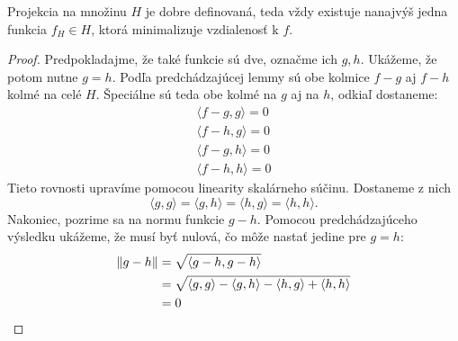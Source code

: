 \begin{lemma}
  Projekcia na množinu $H$ je dobre definovaná, teda vždy existuje
  nanajvýš jedna funkcia $f_H \in H$, ktorá minimalizuje vzdialenosť
  k $f$.
\end{lemma}
\begin{proof}
  Predpokladajme, že také funkcie sú dve, označme ich $g, h$. Ukážeme,
  že potom nutne $g = h$. Podľa predchádzajúcej lemmy sú obe kolmice
  $f - g$ aj $f - h$ kolmé na celé $H$. Špeciálne sú teda obe kolmé
  na $g$ aj na $h$, odkiaľ dostaneme:
  \begin{align}
    \langle f - g, g \rangle = 0 \\
    \langle f - h, g \rangle = 0 \\
    \langle f - g, h \rangle = 0 \\
    \langle f - h, h \rangle = 0
  \end{align}
  Tieto rovnosti upravíme pomocou linearity skalárneho súčinu. Dostaneme
  z nich
  $$\langle g, g \rangle = \langle g, h \rangle = \langle h, g \rangle = \langle h, h \rangle.$$
  Nakoniec, pozrime sa na normu funkcie $g - h$. Pomocou predchádzajúceho
  výsledku ukážeme, že musí byť nulová, čo môže nastať jedine pre $g = h$:
  \begin{align}
    \left\lVert g - h\right\rVert
      &= \sqrt{\langle g - h, g - h \rangle} \\
      &= \sqrt{\langle g, g \rangle - \langle g, h \rangle - \langle h, g \rangle + \langle h, h \rangle} \\
      &= 0
  \end{align}
\end{proof}

